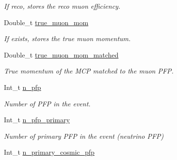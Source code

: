 \begin{DoxyCompactItemize}
\begin{DoxyCompactList}\small\item\em If reco, stores the reco muon efficiency. \end{DoxyCompactList}\item 
\hypertarget{classUBXSecEvent_a967af89c3282493ba4ec96a4bf1592e9}{Double\-\_\-t \hyperlink{classUBXSecEvent_a967af89c3282493ba4ec96a4bf1592e9}{true\-\_\-muon\-\_\-mom}}\label{classUBXSecEvent_a967af89c3282493ba4ec96a4bf1592e9}

\begin{DoxyCompactList}\small\item\em If exists, stores the true muon momentum. \end{DoxyCompactList}\item 
\hypertarget{classUBXSecEvent_ac01db50f50e39aed219935666f441aed}{Double\-\_\-t \hyperlink{classUBXSecEvent_ac01db50f50e39aed219935666f441aed}{true\-\_\-muon\-\_\-mom\-\_\-matched}}\label{classUBXSecEvent_ac01db50f50e39aed219935666f441aed}

\begin{DoxyCompactList}\small\item\em True momentum of the M\-C\-P matched to the muon P\-F\-P. \end{DoxyCompactList}\item 
\hypertarget{classUBXSecEvent_a966e90da255666b555c301b83385e923}{Int\-\_\-t \hyperlink{classUBXSecEvent_a966e90da255666b555c301b83385e923}{n\-\_\-pfp}}\label{classUBXSecEvent_a966e90da255666b555c301b83385e923}

\begin{DoxyCompactList}\small\item\em Number of P\-F\-P in the event. \end{DoxyCompactList}\item 
\hypertarget{classUBXSecEvent_a8b42a4c5da11c709d44d6f51933d7687}{Int\-\_\-t \hyperlink{classUBXSecEvent_a8b42a4c5da11c709d44d6f51933d7687}{n\-\_\-pfp\-\_\-primary}}\label{classUBXSecEvent_a8b42a4c5da11c709d44d6f51933d7687}

\begin{DoxyCompactList}\small\item\em Number of primary P\-F\-P in the event (neutrino P\-F\-P) \end{DoxyCompactList}\item 
\hypertarget{classUBXSecEvent_ae57001de3cd8374785329521c3ce5d5e}{Int\-\_\-t \hyperlink{classUBXSecEvent_ae57001de3cd8374785329521c3ce5d5e}{n\-\_\-primary\-\_\-cosmic\-\_\-pfp}}\label{classUBXSecEvent_ae57001de3cd8374785329521c3ce5d5e}


\end{DoxyCompactItemize}
